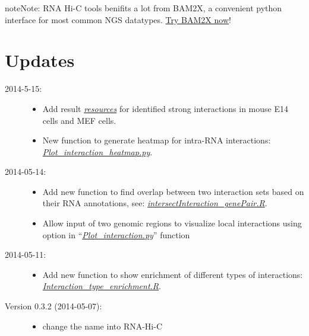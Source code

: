 \documentclass[letterpaper,10pt,english]{sphinxmanual}
\begin{document}
\begin{notice}{note}{Note:}
RNA Hi-C tools benifits a lot from BAM2X, a convenient python interface for most common NGS datatypes. \href{http://www.bam2x.net/}{Try BAM2X now}!
\end{notice}


\chapter{Updates}
\label{index:updates}\begin{description}
\item[{2014-5-15:}] \leavevmode\begin{itemize}
\item {} 
Add result {\hyperref[Data_Resources:resource]{\emph{resources}}} for identified strong interactions in mouse E14 cells and MEF cells.

\item {} 
New function to generate heatmap for intra-RNA interactions: {\hyperref[Visualization:visualizationheatmap]{\emph{Plot\_interaction\_heatmap.py}}}.

\end{itemize}

\item[{2014-05-14:}] \leavevmode\begin{itemize}
\item {} 
Add new function to find overlap between two interaction sets based on their RNA annotations, see: {\hyperref[Analysis_pipeline:intersectiongene]{\emph{intersectInteraction\_genePair.R}}}.

\item {} 
Allow input of two genomic regions to visualize local interactions using  option in ``{\hyperref[Visualization:plotinteraction]{\emph{Plot\_interaction.py}}}'' function

\end{itemize}

\item[{2014-05-11:}] \leavevmode\begin{itemize}
\item {} 
Add new function to show enrichment of different types of interactions: {\hyperref[Visualization:visualizationenrich]{\emph{Interaction\_type\_enrichment.R}}}.

\end{itemize}

\item[{Version 0.3.2 (2014-05-07):}] \leavevmode\begin{itemize}
\item {} 
change the name into RNA-Hi-C


\end{itemize}
\end{description}
\end{document}

